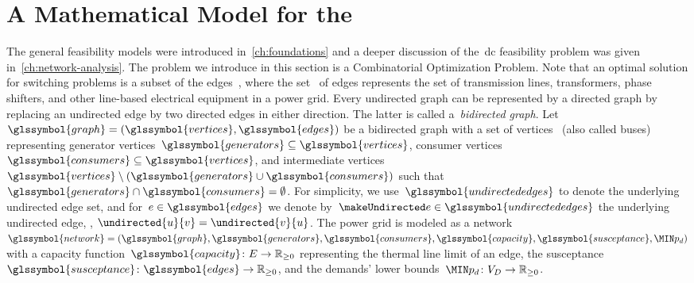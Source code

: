 \section[A Mathematical Model for the Placement of Discrete Control Units]{
A Mathematical Model for the \protect{}} 
% 
\label{ch:switching:sec:model}
% 
The general feasibility models were introduced in~\cref{ch:foundations} and a
deeper discussion of the~\gls{dc} feasibility problem was given
in~\cref{ch:network-analysis}. The problem we introduce in this section is a
Combinatorial Optimization Problem. Note that an optimal solution for switching
problems is a subset of the edges~, where the
set~ of edges represents the set of transmission lines,
transformers, phase shifters, and other line-based electrical equipment in a
power grid. Every undirected graph can be represented by a directed graph by
replacing an undirected edge by two directed edges in either direction. The
latter is called a~\emph{bidirected graph}.
% 
Let~$
\glssymbol{graph}
% 
= 
% 
(
% 
\glssymbol{vertices},
% 
\glssymbol{edges}
% 
)
$ be a bidirected graph with
a set of
vertices~ (also called buses) representing generator
vertices~$
\glssymbol{generators}
% 
\subseteq
\glssymbol{vertices}$, consumer
vertices~$
\glssymbol{consumers}
% 
\subseteq
\glssymbol{vertices}$, and intermediate
vertices~$\glssymbol{vertices}\setminus(
\glssymbol{generators}\cup\glssymbol{consumers})$
such
that~$\glssymbol{generators}\cap\glssymbol{consumers}=\emptyset$.
%
For simplicity, we use~$
% 
\glssymbol{undirectededges}
% 
$ to denote the underlying undirected
edge set, and for~$\edge\in\glssymbol{edges}$ we denote by~$\undirectededge\in
\glssymbol{undirectededges}$ the underlying undirected edge, \ie, $\undirected{
\vertexa}{\vertexb} = \undirected{\vertexb}{\vertexa}$.
The power grid is modeled as a  
% 
network~$\glssymbol{network} =
(\glssymbol{graph},
\glssymbol{generators},
\glssymbol{consumers},
\glssymbol{capacity}, 
\glssymbol{susceptance}, 
\realpowerdemandmin
)$ 
% 
with a capacity function~$\glssymbol{capacity}\colon\edges\to\posreals$
representing the
thermal line limit of an edge, the
susceptance~$\glssymbol{susceptance}\colon\glssymbol{edges}\to\posreals$,
% 
and the demands' lower bounds~$\realpowerdemandmin\colon\consumers\to\posreals$.
% 
